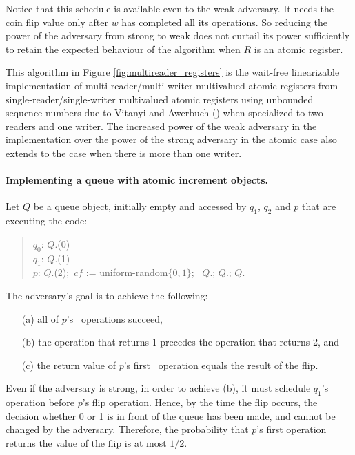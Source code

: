 \documentclass[11pt,letterpaper]{article}
\begin{document}
Notice that this schedule is available even to the weak adversary.
It needs the coin flip value only after $w$ has completed all its operations.
So reducing the power of the adversary from strong to weak
does not curtail its power sufficiently to retain the expected behaviour of the algorithm
when $R$ is an atomic register.

This algorithm in Figure  \ref{fig:multireader_registers} is
the wait-free linearizable implementation
of multi-reader/multi-writer multivalued atomic registers from
single-reader/single-writer multivalued atomic registers
using unbounded sequence numbers
due to Vitanyi and Awerbuch (\cite{vit:atom})
when specialized to two readers and one writer.
The increased power of the weak adversary in the implementation over the power
of the strong adversary in the atomic case also extends to the case when there is more than one writer.



\paragraph{Implementing a queue with atomic increment objects.}
Let $Q$  be a queue object, initially empty and accessed by  $q_1$, $q_2$ and $p$ that are executing the code:

\begin{quote}
$q_0$:   $Q$.\Enqueue(0)\\
$q_1$:   $Q$.\Enqueue(1)\\
$p$: $Q$.\Enqueue(2);\ $cf$ := uniform-random$\{0,1\}$; \ $Q$.\Dequeue; $Q$.\Dequeue; $Q$.\Dequeue\\
\end{quote}

The adversary's goal is to achieve the following:
\begin{enumerate}
 \item[(a)] all of $p$'s \Dequeue\ operations succeed,
 \item[(b)] the \Dequeue operation that returns 1 precedes the \Dequeue operation that returns 2, and
 \item[(c)] the return value of $p$'s first \Dequeue\ operation equals the result of the flip.
\end{enumerate}

Even if the adversary is strong, in order to achieve (b), it must schedule $q_1$'s \Enqueue operation before $p$'s flip operation.
Hence, by the time the flip occurs, the decision whether 0 or 1 is in front of the queue has been made, and cannot be changed by the adversary.
Therefore, the probability that $p$'s first \Dequeue operation returns the value of the flip is at most $1/2$.
\end{document}
